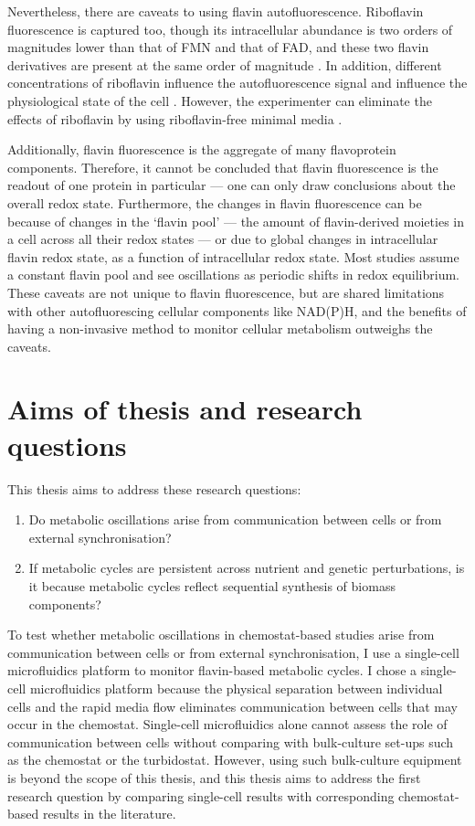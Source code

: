 Nevertheless, there are caveats to using flavin autofluorescence.
Riboflavin fluorescence is captured too, though its intracellular abundance is two orders of magnitudes lower than that of FMN and that of FAD, and these two flavin derivatives are present at the same order of magnitude \parencite{tuCyclicChangesMetabolic2007}.
In addition, different concentrations of riboflavin influence the autofluorescence signal and influence the physiological state of the cell \parencite{maslankaAutofluorescenceYeastSaccharomyces2018}.
However, the experimenter can eliminate the effects of riboflavin by using riboflavin-free minimal media \parencite{verduynEffectBenzoicAcid1992}.

Additionally, flavin fluorescence is the aggregate of many flavoprotein components.
Therefore, it cannot be concluded that flavin fluorescence is the readout of one protein in particular --- one can only draw conclusions about the overall redox state.
Furthermore, the changes in flavin fluorescence can be because of changes in the `flavin pool' --- the amount of flavin-derived moieties in a cell across all their redox states --- or due to global changes in intracellular flavin redox state, as a function of intracellular redox state.
Most studies assume a constant flavin pool and see oscillations as periodic shifts in redox equilibrium.
These caveats are not unique to flavin fluorescence, but are shared limitations with other autofluorescing cellular components like NAD(P)H, and the benefits of having a non-invasive method to monitor cellular metabolism outweighs the caveats.


\section{Aims of thesis and research questions}
\label{sec:intro-aims}

This thesis aims to address these research questions:
\begin{enumerate}
  \item Do metabolic oscillations arise from communication between cells or from external synchronisation?
  \item If metabolic cycles are persistent across nutrient and genetic perturbations, is it because metabolic cycles reflect sequential synthesis of biomass components?
\end{enumerate}

To test whether metabolic oscillations in chemostat-based studies arise from communication between cells or from external synchronisation, I use a single-cell microfluidics platform to monitor flavin-based metabolic cycles.
I chose a single-cell microfluidics platform because the physical separation between individual cells and the rapid media flow eliminates communication between cells that may occur in the chemostat.
Single-cell microfluidics alone cannot assess the role of communication between cells without comparing with bulk-culture set-ups such as the chemostat or the turbidostat.
However, using such bulk-culture equipment is beyond the scope of this thesis, and this thesis aims to address the first research question by comparing single-cell results with corresponding chemostat-based results in the literature.

